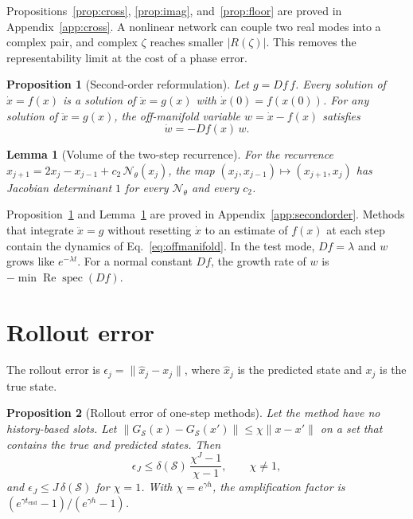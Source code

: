 \documentclass[11pt]{article}
\newtheorem{lemma}{Lemma}
\newtheorem{proposition}{Proposition}
\theoremstyle{definition}
\theoremstyle{remark}
\newcommand{\Net}{\mathcal{N}_\theta}    %
\newcommand{\Meth}{\mathcal{S}}          %
\begin{document}
Propositions~\ref{prop:cross}, \ref{prop:imag}, and~\ref{prop:floor} are proved in Appendix~\ref{app:cross}.
A nonlinear network can couple two real modes into a complex pair, and complex $\zeta$ reaches smaller $|R(\zeta)|$.
This removes the representability limit at the cost of a phase error.

\begin{proposition}[Second-order reformulation]\label{prop:secondorder}
Let $g = Df\, f$.
Every solution of $\dot x = f(x)$ is a solution of $\ddot x = g(x)$ with $\dot x(0) = f(x(0))$.
For any solution of $\ddot x = g(x)$, the off-manifold variable $w = \dot x - f(x)$ satisfies
\begin{equation}\label{eq:offmanifold}
\dot w = -Df(x)\, w.
\end{equation}
\end{proposition}

\begin{lemma}[Volume of the two-step recurrence]\label{lem:det}
For the recurrence $x_{j+1} = 2x_j - x_{j-1} + c_2\,\Net(x_j)$, the map $(x_j, x_{j-1}) \mapsto (x_{j+1}, x_j)$ has Jacobian determinant $1$ for every $\Net$ and every $c_2$.
\end{lemma}

Proposition~\ref{prop:secondorder} and Lemma~\ref{lem:det} are proved in Appendix~\ref{app:secondorder}.
Methods that integrate $\ddot x = g$ without resetting $\dot x$ to an estimate of $f(x)$ at each step contain the dynamics of Eq.~\eqref{eq:offmanifold}.
In the test mode, $Df = \lambda$ and $w$ grows like $e^{-\lambda t}$.
For a normal constant $Df$, the growth rate of $w$ is $-\min \operatorname{Re}\operatorname{spec}(Df)$.

\section{Rollout error}\label{sec:rollout}

The rollout error is $\epsilon_j = \|\hat x_j - x_j\|$, where $\hat x_j$ is the predicted state and $x_j$ is the true state.

\begin{proposition}[Rollout error of one-step methods]\label{prop:rollout}
Let the method have no history-based slots.
Let $\|G_\Meth(x) - G_\Meth(x')\| \le \chi\|x - x'\|$ on a set that contains the true and predicted states.
Then
\begin{equation}\label{eq:rollout}
\epsilon_J \le \delta(\Meth)\, \frac{\chi^J - 1}{\chi - 1}, \qquad \chi \ne 1,
\end{equation}
and $\epsilon_J \le J\,\delta(\Meth)$ for $\chi = 1$.
With $\chi = e^{\gamma h}$, the amplification factor is $(e^{\gamma t_{\mathrm{end}}} - 1)/(e^{\gamma h} - 1)$.
\end{proposition}
\end{document}
